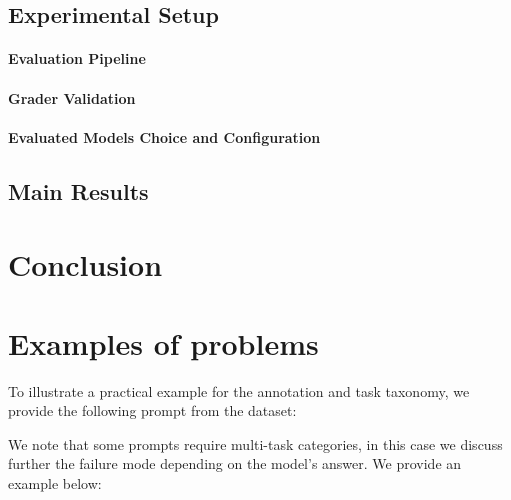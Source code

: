 \documentclass{article}
\begin{document}
\subsection{Experimental Setup}
\paragraph{Evaluation Pipeline}


\paragraph{Grader Validation}


\paragraph{Evaluated Models Choice and Configuration}




\subsection{Main Results}


\section{Conclusion}


% 





\clearpage
\appendix

\section{Examples of problems} \label{appendix:examples}

To illustrate a practical example for the annotation and task taxonomy, we provide the following prompt from the dataset:
 \label{question_example}

We note that some prompts require multi-task categories, in this case we discuss further the failure mode depending on the model's answer. We provide an example below:
 \label{question_example_multi_category} 
\end{document}
